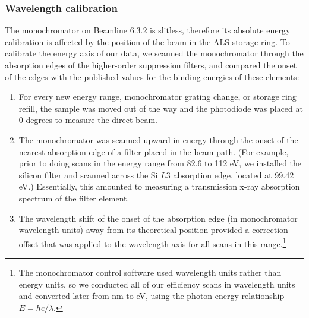 \subsubsection{Wavelength calibration}
The monochromator on Beamline 6.3.2 is slitless, therefore its absolute energy calibration is affected by the position of the beam in the ALS storage ring.  To calibrate the energy axis of our data, we scanned the monochromator through the absorption edges of the higher-order suppression filters, and compared the onset of the edges with the published values for the binding energies of these elements:
	\begin{enumerate}
	\item For every new energy range, monochromator grating change, or storage ring refill, the sample was moved out of the way and the photodiode was placed at 0 degrees to measure the direct beam.
	\item The monochromator was scanned upward in energy through the onset of the nearest absorption edge of a filter placed in the beam path.  (For example, prior to doing scans in the energy range from 82.6 to 112 eV, we installed the silicon filter and scanned across the Si $L3$ absorption edge, located at 99.42 eV.)  Essentially, this amounted to measuring a transmission x-ray absorption spectrum of the filter element.
	\item The wavelength shift of the onset of the absorption edge (in monochromator wavelength units) away from its theoretical position provided a correction offset that was applied to the wavelength axis for all scans in this range.\footnote{The monochromator control software used wavelength units rather than energy units, so we conducted all of our efficiency scans in wavelength units and converted later from nm to eV, using the photon energy relationship $E=hc/\lambda$.}
	\end{enumerate}
	
